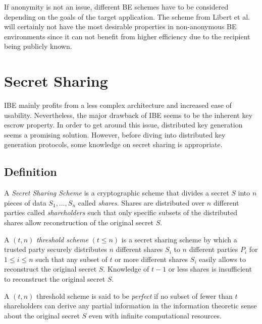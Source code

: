 If anonymity is not an issue, different BE schemes have to be considered depending on the goals of the target application. The scheme from Libert et al.~\cite{art:LibertPQ12} will certainly not have the most desirable properties in non-anonymous BE environments since it can not benefit from higher efficiency due to the recipient being publicly known.

\section{Secret Sharing}
IBE mainly profits from a less complex architecture and increased ease of usability. Nevertheless, the major drawback of IBE seems to be the inherent key escrow property. In order to get around this issue, distributed key generation seems a promising solution. However, before diving into distributed key generation protocols, some knowledge on secret sharing is appropriate.

\subsection{Definition}
\begin{defn}
\label{def:secret_sharing_scheme}
 A \textit{Secret Sharing Scheme} is a cryptographic scheme that divides a secret $S$ into $n$ pieces of data $S_1, \ldots, S_n$ called \textit{shares}. Shares are distributed over $n$ different parties called \textit{shareholders} such that only specific subsets of the distributed shares allow reconstruction of the original secret $S$.
\end{defn}

\begin{defn}
\label{def:threshold_scheme}
 A $\left( t, n \right)$ \textit{threshold scheme} $\left( t \leq n \right)$ is a secret sharing scheme by which a trusted party securely distributes $n$ different shares $S_i$ to $n$ different parties $P_i$ for $1 \leq i \leq n$ such that any subset of $t$ or more different shares $S_i$ easily allows to reconstruct the original secret $S$. Knowledge of $t-1$ or less shares is insufficient to reconstruct the original secret $S$.
\end{defn}

\begin{defn}
\label{def:threshold_scheme}
 A $\left( t, n \right)$ threshold scheme is said to be \textit{perfect} if no subset of fewer than $t$ shareholders can derive any partial information in the information theoretic sense about the original secret $S$ even with infinite computational resources.
\end{defn}

